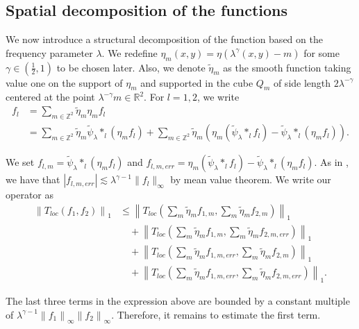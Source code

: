 \documentclass[a4paper,reqno]{amsart}
\theoremstyle{definition}
\theoremstyle{remark}
\numberwithin{equation}{section}
\newcommand{\R}{{\mathbb {R}}}
\newcommand{\Z}{{\mathbb Z}}
\begin{document}
	\subsection{Spatial decomposition of the functions}
	We now introduce a structural decomposition of the function based on the frequency parameter $\lambda$. We redefine $\eta_m(x, y)=\eta\left(\lambda^\gamma(x, y)-m\right)$ for some $\gamma\in\left(\frac{1}{2}, 1\right)$ to be chosen later. Also, we denote $\widetilde{\eta}_m$ as the smooth function taking value one on the support of $\eta_m$ and supported in the cube $Q_{m}$ of side length $2\lambda^{-\gamma}$ centered at the point $\lambda^{-\gamma}m\in\R^2$. For $l=1,2$, we write
	\[
	\begin{aligned}
		f_l & =\sum_{m \in \Z^2} \widetilde{\eta}_m \eta_m f_l \\
		& =\sum_{m \in \Z^2} \widetilde{\eta}_m \widetilde{\psi}_\lambda *_l\left(\eta_m f_l\right)+\sum_{m \in \Z^2}\widetilde{\eta}_m\left(\eta_m\left(\widetilde{\psi}_\lambda *_l f_l\right)-\widetilde{\psi}_\lambda *_l\left(\eta_m f_l\right)\right).
	\end{aligned}
	\]
	
	We set $f_{l,m}=\widetilde{\psi}_\lambda *_l\left(\eta_m f_l\right)$ and $f_{l, m, err}= \eta_m\left(\widetilde{\psi}_\lambda *_l f_l\right)-\widetilde{\psi}_\lambda *_l\left(\eta_m f_l\right)$.
	As in , we have that $\left|f_{l, m, err}\right| \lesssim \lambda^{\gamma-1} \|f_l\|_{\infty}$ by mean value theorem. We write our operator as
	\[
	\begin{aligned}
		\left\|T_{loc}\left(f_1, f_2\right)\right\|_1 &\leq\left\|T_{loc}\left(\sum_m \widetilde{\eta}_m f_{1, m}, \sum_m \widetilde{\eta}_{m} f_{2, m}\right)\right\|_1 \\
		& \quad+\left\|T_{loc}\left(\sum_m \widetilde{\eta}_m f_{1, m}, \sum_m \widetilde{\eta}_m f_{2, m, err}\right)\right\|_1 \\
		& \quad+\left\|T_{loc}\left(\sum_m \widetilde{\eta}_m f_{1, m, err}, \sum_m \widetilde{\eta}_m f_{2, m}\right)\right\|_1 \\
		& \quad+\left\|T_{loc}\left(\sum_m \widetilde{\eta}_m f_{1, m, err}, \sum_m \widetilde{\eta}_m f_{2, m, err}\right)\right\|_1.
	\end{aligned}
	\]
	
	The last three terms in the expression above are bounded by a constant multiple of $\lambda^{\gamma-1}\left\|f_1\right\|_{\infty}\left\|f_2\right\|_{\infty}$. Therefore, it remains to estimate the first term.
\end{document}
